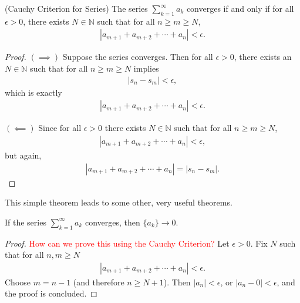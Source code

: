 \documentclass{ximera}
\begin{document}

\begin{theorem}{(Cauchy Criterion for Series)}
    The series $\sum\limits_{k=1}^\infty a_k$ converges if and only if for all $\epsilon > 0$, there exists $N \in \mathbb{N}$ such that for all $n\geq m\geq N$, 
    \begin{align*}
        |a_{m+1} + a_{m+2} + \cdots + a_n| < \epsilon.
    \end{align*}
\end{theorem}
\begin{proof}
    $(\implies)$  Suppose the series converges.  Then for all $\epsilon > 0$, there exists an $N\in\mathbb{N}$ such that for all $n\geq m \geq N$ implies
    \begin{align*}
        |s_n - s_m| < \epsilon,
    \end{align*}
    which is exactly 
    \begin{align*}
        |a_{m+1} + a_{m+2} + \cdots + a_n| < \epsilon.
    \end{align*}

    $(\impliedby)$ Since for all $\epsilon > 0$ there exists  $N \in \mathbb{N}$ such that for all $n\geq m \geq N$, 
    \begin{align*}
        |a_{m+1} + a_{m+2} + \cdots + a_n| < \epsilon,
    \end{align*}
    but again, 
    \begin{align*}
        |a_{m+1} + a_{m+2} + \cdots + a_n| = |s_n - s_m|.
    \end{align*}
\end{proof}

This simple theorem leads to some other, very useful theorems.

\begin{theorem}
    If the series $\sum\limits_{k=1}^\infty a_k$ converges, then $\{a_k\} \to 0$.
\end{theorem}
\begin{proof}
    \textcolor{red}{How can we prove this using the Cauchy Criterion?}
    Let $\epsilon > 0$.  Fix $N$ such that for all $n,m \geq N$
    \begin{align*}
        |a_{m+1} + a_{m+2} + \cdots + a_n| < \epsilon.
    \end{align*}
    Choose $m = n-1$ (and therefore $n \geq N+1$).  Then $|a_n| < \epsilon$, or $|a_n - 0| < \epsilon$, and the proof is concluded.
\end{proof}
\end{document}
